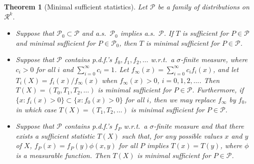 \documentclass{article}
\newtheorem{theorem}{Theorem}[section]
\begin{document}
\begin{theorem}[Minimal sufficient statistics]
\label{thm:2.3}
Let $\mathcal{P}$ be a family of distributions on $\mathcal{R}^{k}$.
\begin{itemize}
\item[(i)] Suppose that $\mathcal{P}_{0} \subset \mathcal{P}$ and a.s.\ $\mathcal{P}_{0}$ implies a.s.\ $\mathcal{P}$. If $T$ is sufficient for $P \in \mathcal{P}$ and minimal sufficient for $P \in \mathcal{P}_{0}$, then $T$ is minimal sufficient for $P \in \mathcal{P}$.

\item[(ii)] Suppose that $\mathcal{P}$ contains p.d.f.'s $f_{0}, f_{1}, f_{2}, \ldots$ w.r.t.\ a $\sigma$-finite measure, where $c_{i} > 0$ for all $i$ and $\sum_{i=0}^{\infty} c_{i} = 1$. Let $f_{\infty}(x) = \sum_{i=0}^{\infty} c_{i} f_{i}(x)$, and let $T_{i}(X) = f_{i}(x) / f_{\infty}(x)$ when $f_{\infty}(x) > 0$, $i = 0, 1, 2, \ldots$. Then $T(X) = (T_{0}, T_{1}, T_{2}, \ldots)$ is minimal sufficient for $P \in \mathcal{P}$. Furthermore, if $\{x : f_{i}(x) > 0\} \subset \{x : f_{0}(x) > 0\}$ for all $i$, then we may replace $f_{\infty}$ by $f_{0}$, in which case $T(X) = (T_{1}, T_{2}, \ldots)$ is minimal sufficient for $P \in \mathcal{P}$.

\item[(iii)] Suppose that $\mathcal{P}$ contains p.d.f.'s $f_{P}$ w.r.t.\ a $\sigma$-finite measure and that there exists a sufficient statistic $T(X)$ such that, for any possible values $x$ and $y$ of $X$, $f_{P}(x) = f_{P}(y) \phi(x, y)$ for all $P$ implies $T(x) = T(y)$, where $\phi$ is a measurable function. Then $T(X)$ is minimal sufficient for $P \in \mathcal{P}$.
\end{itemize}
\end{theorem}
\end{document}
